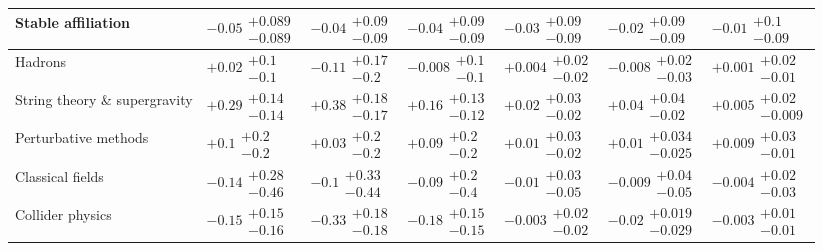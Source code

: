 \begin{table}[H]
\begin{tabular}{lllllll}
\textbf{Stable affiliation} & $-0.05\substack{+0.089 \\ -0.089}$ & $-0.04\substack{+0.09 \\ -0.09}$ & $-0.04\substack{+0.09 \\ -0.09}$ & $-0.03\substack{+0.09 \\ -0.09}$ & $-0.02\substack{+0.09 \\ -0.09}$ & $-0.01\substack{+0.1 \\ -0.09}$ \\
\hline Hadrons & $+0.02\substack{+0.1 \\ -0.1}$ & $-0.11\substack{+0.17 \\ -0.2}$ & $-0.008\substack{+0.1 \\ -0.1}$ & $+0.004\substack{+0.02 \\ -0.02}$ & $-0.008\substack{+0.02 \\ -0.03}$ & $+0.001\substack{+0.02 \\ -0.01}$ \\
String theory \& supergravity & $\bm{+0.29}\substack{+0.14 \\ -0.14}$ & $\bm{+0.38}\substack{+0.18 \\ -0.17}$ & $\bm{+0.16}\substack{+0.13 \\ -0.12}$ & $\bm{+0.02}\substack{+0.03 \\ -0.02}$ & $\bm{+0.04}\substack{+0.04 \\ -0.02}$ & $+0.005\substack{+0.02 \\ -0.009}$ \\
Perturbative methods & $+0.1\substack{+0.2 \\ -0.2}$ & $+0.03\substack{+0.2 \\ -0.2}$ & $+0.09\substack{+0.2 \\ -0.2}$ & $+0.01\substack{+0.03 \\ -0.02}$ & $+0.01\substack{+0.034 \\ -0.025}$ & $+0.009\substack{+0.03 \\ -0.01}$ \\
Classical fields & $-0.14\substack{+0.28 \\ -0.46}$ & $-0.1\substack{+0.33 \\ -0.44}$ & $-0.09\substack{+0.2 \\ -0.4}$ & $-0.01\substack{+0.03 \\ -0.05}$ & $-0.009\substack{+0.04 \\ -0.05}$ & $-0.004\substack{+0.02 \\ -0.03}$ \\
Collider physics & $\bm{-0.15}\substack{+0.15 \\ -0.16}$ & $\bm{-0.33}\substack{+0.18 \\ -0.18}$ & $\bm{-0.18}\substack{+0.15 \\ -0.15}$ & $-0.003\substack{+0.02 \\ -0.02}$ & $\bm{-0.02}\substack{+0.019 \\ -0.029}$ & $-0.003\substack{+0.01 \\ -0.01}$ \\

\end{tabular}
\end{table}
